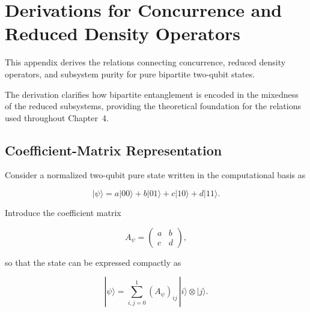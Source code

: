 
\chapter{Derivations for Concurrence and Reduced Density Operators}
\label{app:concurrence_reduced_density_operators}

This appendix derives the relations connecting concurrence, reduced density operators, and subsystem purity for pure bipartite two-qubit states.

\medskip

The derivation clarifies how bipartite entanglement is encoded in the mixedness of the reduced subsystems, providing the theoretical foundation for the relations used throughout Chapter~4.


\section*{Coefficient-Matrix Representation}

Consider a normalized two-qubit pure state written in the computational basis as

\begin{equation}
|\psi\rangle
=
a|00\rangle
+
b|01\rangle
+
c|10\rangle
+
d|11\rangle.
\label{eq:generic_two_qubit_state}
\end{equation}

Introduce the coefficient matrix

\begin{equation}
A_\psi
=
\begin{pmatrix}
a & b\\
c & d
\end{pmatrix},
\label{eq:coefficient_matrix_definition}
\end{equation}

so that the state can be expressed compactly as

\begin{equation}
|\psi\rangle
=
\sum_{i,j=0}^{1}
(A_\psi)_{ij}
\,|i\rangle \otimes |j\rangle.
\label{eq:state_coefficient_matrix_expansion}
\end{equation}

